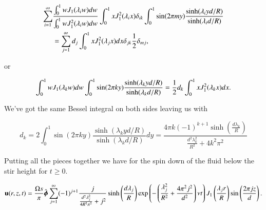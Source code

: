 \begin{equation}\label{eqn:coffeeCupWithBottom:960}
\begin{aligned}
\sum_{i=1}^\infty
&\frac{
\int_0^1 w J_1 (\lambda_i w) dw
}{
\int_0^1 w J_1^2 (\lambda_i w) dw
}
\int_0^1 x J_1^2(\lambda_i x) \delta_{i k} \int_0^1 \sin( 2 \pi m y ) \frac{\sinh(\lambda_i y d/R)}{\sinh(\lambda_i d/R) } \\
&=
\sum_{j = 1}^\infty d_j \int_0^1 x J_1^2(\lambda_j x) dx \delta_{j k} \frac{1}{2} \delta_{m j},
\end{aligned}
\end{equation}

or

\begin{equation}\label{eqn:coffeeCupWithBottom:980}
\int_0^1 w J_1 (\lambda_k w) dw
\int_0^1 \sin( 2 \pi k y ) \frac{\sinh(\lambda_k y d/R)}{\sinh(\lambda_k d/R) }
=
\frac{1}{2} d_k \int_0^1 x J_1^2(\lambda_k x) dx.
\end{equation}

We've got the same Bessel integral on both sides leaving us with

\begin{equation}\label{eqn:coffeeCupWithBottom:1000}
d_k = 2 \int_0^1 \sin( 2 \pi k y ) \frac{\sinh(\lambda_k y d/R)}{\sinh(\lambda_k d/R) } dy
=
\frac{4 \pi k (-1)^{k+1} \sinh \left(\frac{d \lambda_k}{R}\right)}{\frac{d^2 \lambda_k^2}{R^2} + 4 k^2 \pi^2}
\end{equation}

Putting all the pieces together we have for the spin down of the fluid below the stir height for $t \ge 0$.

\begin{dmath}\label{eqn:coffeeCupWithBottom:1020}
\Bu(r, z, t) 
= 
\frac{\Omega s}{\pi} \phicap \sum_{j = 1}^\infty 
(-1)^{j+1}
\frac{j }{\frac{d^2 \lambda_j^2 }{4 R^2 \pi^2}+ j^2}
\sinh \left(\frac{d \lambda_j}{R}\right)
\exp\left( -\left( \frac{\lambda_j^2}{R^2} + \frac{4 \pi^2 j^2}{d^2} \right) \nu t\right)
J_1 \left(\frac{\lambda_j r}{R}\right) 
\sin\left( \frac{2 \pi j z}{d} \right) 
.
\end{dmath}

